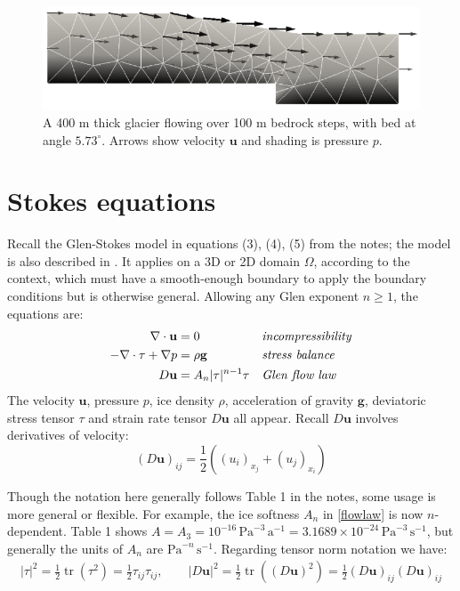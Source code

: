 \documentclass[letterpaper,final,12pt,reqno]{amsart}
\newcommand{\trace}{\operatorname{tr}}
\newcommand{\bg}{\mathbf{g}}
\newcommand{\bu}{\mathbf{u}}
\begin{document}
\begin{figure}[h]
\includegraphics[width=\textwidth,angle=-5.7296]{stepflowlin}  %
\caption{A 400 m thick glacier flowing over 100 m bedrock steps, with bed at angle $5.73^\circ$.  Arrows show velocity $\bu$ and shading is pressure $p$.}
\label{fig:stepflowlin}
\end{figure}


\section{Stokes equations}

Recall the Glen-Stokes model in equations (3), (4), (5) from the notes; the model is also described in \cite{GreveBlatter2009,JouvetRappaz2011}.  It applies on a 3D or 2D domain $\Omega$, according to the context, which must have a smooth-enough boundary to apply the boundary conditions but is otherwise general.  Allowing any Glen exponent $n\ge 1$, the equations are:
\begin{align}
\nabla \cdot \bu &= 0 &&\text{\emph{incompressibility}} \label{incompressible} \\
- \nabla \cdot \tau + \nabla p &= \rho \bg &&\text{\emph{stress balance}} \label{forcebalance} \\
D\bu &= A_n |\tau|^{n-1} \tau &&\text{\emph{Glen flow law}} \label{flowlaw}
\end{align}
The velocity $\bu$, pressure $p$, ice density $\rho$, acceleration of gravity $\bg$, deviatoric stress tensor $\tau$ and strain rate tensor $D\bu$ all appear.  Recall $D\bu$ involves derivatives of velocity:
\begin{equation}
(D\bu)_{ij} = \frac{1}{2} \left((u_i)_{x_j} + (u_j)_{x_i}\right) \label{strainrate}
\end{equation}

Though the notation here generally follows Table 1 in the notes, some usage is more general or flexible.  For example, the ice softness $A_n$ in \eqref{flowlaw} is now $n$-dependent.  Table 1 shows $A = A_3 = 10^{-16} \,\text{Pa}^{-3}\,\text{a}^{-1} = 3.1689 \times 10^{-24} \,\text{Pa}^{-3}\,\text{s}^{-1}$, but generally the units of $A_n$ are $\text{Pa}^{-n}\,\text{s}^{-1}$.  Regarding tensor norm notation we have:
\begin{align*}
|\tau|^2 = \frac{1}{2} \trace\left(\tau^2\right) = \frac{1}{2} \tau_{ij} \tau_{ij}, \qquad |D\bu|^2 = \frac{1}{2} \trace\left((D\bu)^2\right) = \frac{1}{2} (D\bu)_{ij} (D\bu)_{ij}
\end{align*}
\end{document}
